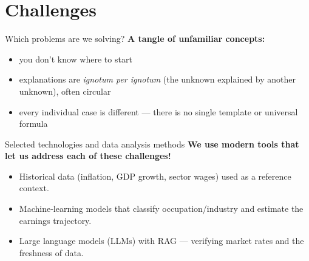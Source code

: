 \section{Challenges}

\begin{frame}[t]{Which problems are we solving?}
\textbf{A tangle of unfamiliar concepts:}
    \pause
\begin{itemize}
    \item you don’t know where to start
    \pause
    \item explanations are \emph{ignotum per ignotum} (the unknown explained by another unknown), often circular
    \pause
    \item every individual case is different — there is no single template or universal formula
\end{itemize}
\end{frame}

\begin{frame}[t]{Selected technologies and data analysis methods}
\textbf{We use modern tools that let us address each of these challenges!}
    \pause
\begin{itemize}
  \item Historical data (inflation, GDP growth, sector wages) used as a reference context.
  \pause
  \item Machine‑learning models that classify occupation/industry and estimate the earnings trajectory.
  \pause
  \item Large language models (LLMs) with RAG — verifying market rates and the freshness of data.
\end{itemize}
\end{frame}
